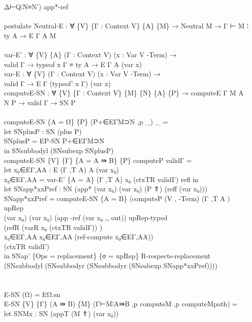 {\begin{code}
{\>      Δ⊢Q∶N≡N') app*-ref\<\\
\>\<\\
\>postulate Neutral-E : ∀ \{V\} \{Γ : Context V\} \{A\} \{M\} → Neutral M → Γ ⊢ M ∶ ty A → E Γ A M\<\\
\>\<\\
\>var-E' : ∀ \{V\} \{A\} (Γ : Context V) (x : Var V -Term) → \<\\
\>  valid Γ → typeof x Γ ≡ ty A → E Γ A (var x)\<\\
\>var-E : ∀ \{V\} (Γ : Context V) (x : Var V -Term) → \<\\
\>        valid Γ → E Γ (typeof' x Γ) (var x)\<\\
\>computeE-SN : ∀ \{V\} \{Γ : Context V\} \{M\} \{N\} \{A\} \{P\} → computeE Γ M A N P → valid Γ → SN P\<\\
\>\<\\
\>computeE-SN \{A = Ω\} \{P\} (P+∈EΓM⊃N ,p \_) \_ = \<\\
\>  let SNplusP : SN (plus P)\<\\
\>      SNplusP = EP-SN P+∈EΓM⊃N \<\\
\>  in SNsubbodyl (SNsubexp SNplusP)\<\\
\>computeE-SN \{V\} \{Γ\} \{A = A ⇛ B\} \{P\} computeP validΓ =\<\\
\>  let x₀∈EΓ,AA : E (Γ ,T A) A (var x₀)\<\\
\>      x₀∈EΓ,AA = var-E' \{A = A\} (Γ ,T A) x₀ (ctxTR validΓ) refl in\<\\
\>  let SNapp*xxPref : SN (app* (var x₀) (var x₀) (P ⇑) (reff (var x₀)))\<\\
\>      SNapp*xxPref = computeE-SN \{A = B\} (computeP (V , -Term) (Γ ,T A ) upRep \<\\
\>          (var x₀) (var x₀) (app -ref (var x₀ ,, out)) upRep-typed \<\\
\>          (refR (varR x₀ (ctxTR validΓ)) )\<\\
\>          x₀∈EΓ,AA x₀∈EΓ,AA (ref-compute x₀∈EΓ,AA)) \<\\
\>          (ctxTR validΓ)\<\\
\>  in SNap' \{Ops = replacement\} \{σ = upRep\} R-respects-replacement (SNsubbodyl (SNsubbodyr (SNsubbodyr (SNsubexp SNapp*xxPref))))\<\\
\>\<\\
\>\<\\
\>E-SN (Ω) = EΩ.sn\<\\
\>E-SN \{V\} \{Γ\} (A ⇛ B) \{M\} (Γ⊢M∶A⇛B ,p computeM ,p computeMpath) =\<\\
\>  let SNMx : SN (appT (M ⇑) (var x₀))\<\\
}
\end{code}}
